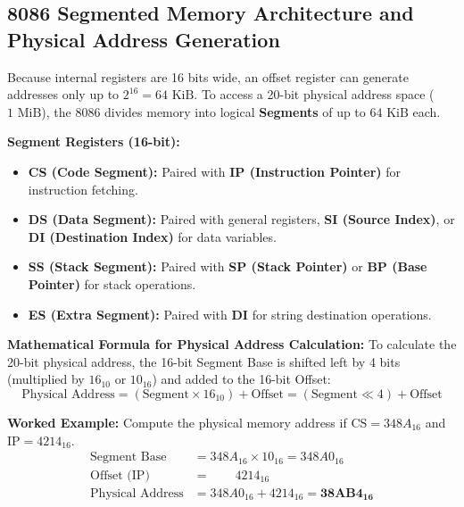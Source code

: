 \subsection{8086 Segmented Memory Architecture and Physical Address Generation}
Because internal registers are 16 bits wide, an offset register can generate addresses only up to $2^{16} = 64\text{ KiB}$. To access a 20-bit physical address space ($1\text{ MiB}$), the 8086 divides memory into logical \textbf{Segments} of up to $64\text{ KiB}$ each.

\textbf{Segment Registers (16-bit):}
\begin{itemize}
    \item \textbf{CS (Code Segment):} Paired with \textbf{IP (Instruction Pointer)} for instruction fetching.
    \item \textbf{DS (Data Segment):} Paired with general registers, \textbf{SI (Source Index)}, or \textbf{DI (Destination Index)} for data variables.
    \item \textbf{SS (Stack Segment):} Paired with \textbf{SP (Stack Pointer)} or \textbf{BP (Base Pointer)} for stack operations.
    \item \textbf{ES (Extra Segment):} Paired with \textbf{DI} for string destination operations.
\end{itemize}

\textbf{Mathematical Formula for Physical Address Calculation:}
To calculate the 20-bit physical address, the 16-bit Segment Base is shifted left by 4 bits (multiplied by $16_{10}$ or $10_{16}$) and added to the 16-bit Offset:
\begin{equation}
\label{eq:physical_address_8086}
\text{Physical Address} = (\text{Segment} \times 16_{10}) + \text{Offset} = (\text{Segment} \ll 4) + \text{Offset}
\end{equation}

\textbf{Worked Example:} Compute the physical memory address if $\text{CS} = 348A_{16}$ and $\text{IP} = 4214_{16}$.
\begin{align*}
\text{Segment Base} &= 348A_{16} \times 10_{16} = 348A0_{16} \\
\text{Offset (IP)}  &= \phantom{0000}4214_{16} \\
\text{Physical Address} &= 348A0_{16} + 4214_{16} = \mathbf{38AB4_{16}}
\end{align*}

